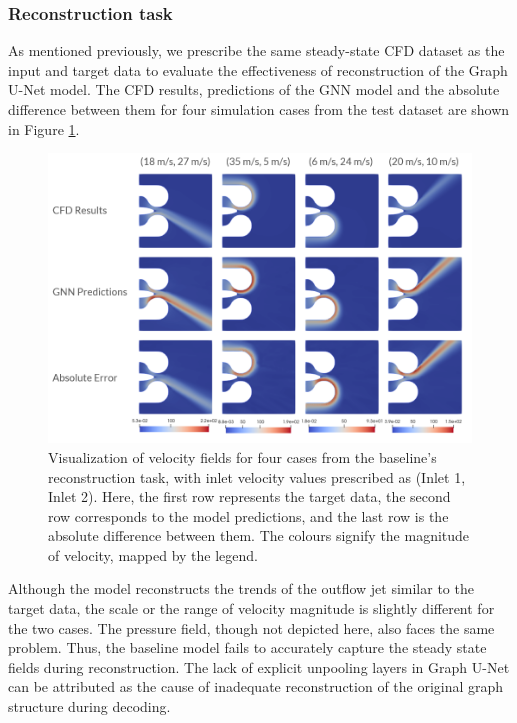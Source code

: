 \subsubsection{Reconstruction task}
As mentioned previously, we prescribe the same steady-state CFD dataset as the input and target data to evaluate the effectiveness of reconstruction of the Graph U-Net model. The CFD results, predictions of the GNN model and the absolute difference between them for four simulation cases from the test dataset are shown in Figure \ref{blrecon}.\\
\begin{figure}[ht]
    \centering
    \includegraphics[width=14cm]{images/Methodology/allvelrecon.png}
    \caption{Visualization of velocity fields for four cases from the baseline's reconstruction task, with inlet velocity values prescribed as (Inlet 1, Inlet 2). Here, the first row represents the target data, the second row corresponds to the model predictions, and the last row is the absolute difference between them. The colours signify the magnitude of velocity, mapped by the legend.} 
    \label{blrecon}
\end{figure}
Although the model reconstructs the trends of the outflow jet similar to the target data, the scale or the range of velocity magnitude is slightly different for the two cases. The pressure field, though not depicted here, also faces the same problem. Thus, the baseline model fails to accurately capture the steady state fields during reconstruction. The lack of explicit unpooling layers in Graph U-Net can be attributed as the cause of inadequate reconstruction of the original graph structure during decoding. 

